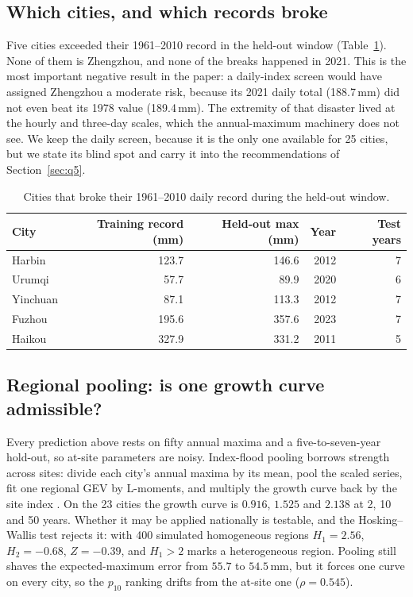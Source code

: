 \subsection{Which cities, and which records broke}

Five cities exceeded their 1961--2010 record in the held-out window (Table~\ref{tab:records}). None of them is Zhengzhou, and none of the breaks happened in 2021. This is the most important negative result in the paper: a daily-index screen would have assigned Zhengzhou a moderate risk, because its 2021 daily total (188.7\,mm) did not even beat its 1978 value (189.4\,mm). The extremity of that disaster lived at the hourly and three-day scales, which the annual-maximum machinery does not see. We keep the daily screen, because it is the only one available for 25 cities, but we state its blind spot and carry it into the recommendations of Section~\ref{sec:q5}.

\begin{table}[H]
\centering
\caption{Cities that broke their 1961--2010 daily record during the held-out window.}
\label{tab:records}
\small
\begin{tabular}{lrrrr}
\toprule
City & Training record (mm) & Held-out max (mm) & Year & Test years\\
\midrule
Harbin & 123.7 & 146.6 & 2012 & 7\\
Urumqi & 57.7 & 89.9 & 2020 & 6\\
Yinchuan & 87.1 & 113.3 & 2012 & 7\\
Fuzhou & 195.6 & 357.6 & 2023 & 7\\
Haikou & 327.9 & 331.2 & 2011 & 5\\
\bottomrule
\end{tabular}
\end{table}

\subsection{Regional pooling: is one growth curve admissible?}

Every prediction above rests on fifty annual maxima and a five-to-seven-year hold-out, so at-site parameters are noisy. Index-flood pooling \cite{hosking1997} borrows strength across sites: divide each city's annual maxima by its mean, pool the scaled series, fit one regional GEV by L-moments, and multiply the growth curve back by the site index \cite{hosking1985}. On the 23 cities the growth curve is $0.916$, $1.525$ and $2.138$ at 2, 10 and 50 years. Whether it may be applied nationally is testable, and the Hosking--Wallis test rejects it: with 400 simulated homogeneous regions $H_1=2.56$, $H_2=-0.68$, $Z=-0.39$, and $H_1>2$ marks a heterogeneous region. Pooling still shaves the expected-maximum error from $55.7$ to $54.5$\,mm, but it forces one curve on every city, so the $p_{10}$ ranking drifts from the at-site one ($\rho=0.545$).

